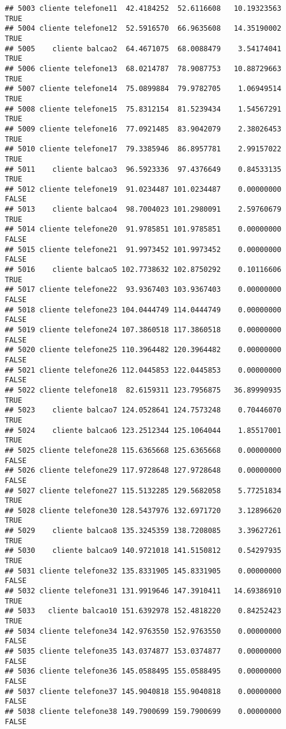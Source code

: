 \documentclass[
]{article}
\begin{document}
\begin{verbatim}
## 5003 cliente telefone11  42.4184252  52.6116608   10.19323563     TRUE
## 5004 cliente telefone12  52.5916570  66.9635608   14.35190002     TRUE
## 5005    cliente balcao2  64.4671075  68.0088479    3.54174041     TRUE
## 5006 cliente telefone13  68.0214787  78.9087753   10.88729663     TRUE
## 5007 cliente telefone14  75.0899884  79.9782705    1.06949514     TRUE
## 5008 cliente telefone15  75.8312154  81.5239434    1.54567291     TRUE
## 5009 cliente telefone16  77.0921485  83.9042079    2.38026453     TRUE
## 5010 cliente telefone17  79.3385946  86.8957781    2.99157022     TRUE
## 5011    cliente balcao3  96.5923336  97.4376649    0.84533135     TRUE
## 5012 cliente telefone19  91.0234487 101.0234487    0.00000000    FALSE
## 5013    cliente balcao4  98.7004023 101.2980091    2.59760679     TRUE
## 5014 cliente telefone20  91.9785851 101.9785851    0.00000000    FALSE
## 5015 cliente telefone21  91.9973452 101.9973452    0.00000000    FALSE
## 5016    cliente balcao5 102.7738632 102.8750292    0.10116606     TRUE
## 5017 cliente telefone22  93.9367403 103.9367403    0.00000000    FALSE
## 5018 cliente telefone23 104.0444749 114.0444749    0.00000000    FALSE
## 5019 cliente telefone24 107.3860518 117.3860518    0.00000000    FALSE
## 5020 cliente telefone25 110.3964482 120.3964482    0.00000000    FALSE
## 5021 cliente telefone26 112.0445853 122.0445853    0.00000000    FALSE
## 5022 cliente telefone18  82.6159311 123.7956875   36.89990935     TRUE
## 5023    cliente balcao7 124.0528641 124.7573248    0.70446070     TRUE
## 5024    cliente balcao6 123.2512344 125.1064044    1.85517001     TRUE
## 5025 cliente telefone28 115.6365668 125.6365668    0.00000000    FALSE
## 5026 cliente telefone29 117.9728648 127.9728648    0.00000000    FALSE
## 5027 cliente telefone27 115.5132285 129.5682058    5.77251834     TRUE
## 5028 cliente telefone30 128.5437976 132.6971720    3.12896620     TRUE
## 5029    cliente balcao8 135.3245359 138.7208085    3.39627261     TRUE
## 5030    cliente balcao9 140.9721018 141.5150812    0.54297935     TRUE
## 5031 cliente telefone32 135.8331905 145.8331905    0.00000000    FALSE
## 5032 cliente telefone31 131.9919646 147.3910411   14.69386910     TRUE
## 5033   cliente balcao10 151.6392978 152.4818220    0.84252423     TRUE
## 5034 cliente telefone34 142.9763550 152.9763550    0.00000000    FALSE
## 5035 cliente telefone35 143.0374877 153.0374877    0.00000000    FALSE
## 5036 cliente telefone36 145.0588495 155.0588495    0.00000000    FALSE
## 5037 cliente telefone37 145.9040818 155.9040818    0.00000000    FALSE
## 5038 cliente telefone38 149.7900699 159.7900699    0.00000000    FALSE

\end{verbatim}
\end{document}
